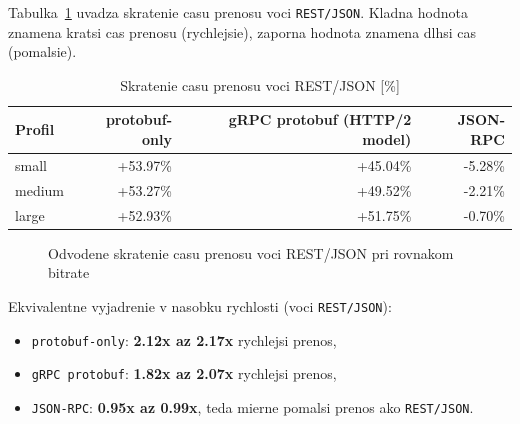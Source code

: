 \documentclass[12pt,a4paper]{report}
\begin{document}
Tabulka~\ref{tab:transfer-faster-vs-rest} uvadza skratenie casu prenosu
voci \texttt{REST/JSON}. Kladna hodnota znamena kratsi cas prenosu
(rychlejsie), zaporna hodnota znamena dlhsi cas (pomalsie).

\begin{table}[htbp]
\centering
\caption{Skratenie casu prenosu voci REST/JSON [\%]}
\label{tab:transfer-faster-vs-rest}
\begin{tabular}{|l|r|r|r|}
\hline
Profil & protobuf-only & gRPC protobuf (HTTP/2 model) & JSON-RPC \\
\hline
small  & +53.97\% & +45.04\% & -5.28\% \\
medium & +53.27\% & +49.52\% & -2.21\% \\
large  & +52.93\% & +51.75\% & -0.70\% \\
\hline
\end{tabular}
\end{table}

\begin{figure}[htbp]
\centering
{}
\caption{Odvodene skratenie casu prenosu voci REST/JSON pri rovnakom bitrate}
\label{fig:transfer-faster-vs-rest}
\end{figure}

Ekvivalentne vyjadrenie v nasobku rychlosti (voci \texttt{REST/JSON}):
\begin{itemize}
  \item \texttt{protobuf-only}: \textbf{2.12x az 2.17x} rychlejsi prenos,
  \item \texttt{gRPC protobuf}: \textbf{1.82x az 2.07x} rychlejsi prenos,
  \item \texttt{JSON-RPC}: \textbf{0.95x az 0.99x}, teda mierne pomalsi
  prenos ako \texttt{REST/JSON}.
\end{itemize}
\end{document}

